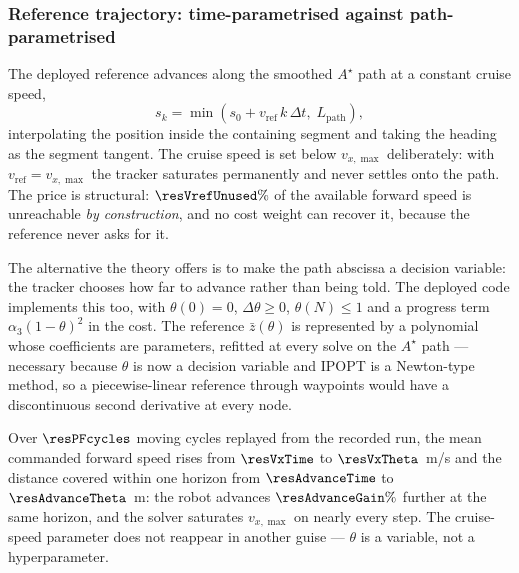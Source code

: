 \documentclass[11pt,a4paper]{article}
\newcommand{\astar}{$A^\star$}
\begin{document}
\subsubsection{Reference trajectory: time-parametrised against path-parametrised}
\label{sec:pathfollow}

The deployed reference advances along the smoothed \astar{} path at a constant cruise speed,
\begin{equation}
  s_k=\min\!\left(s_0+v_{\mathrm{ref}}\,k\,\Delta t,\; L_{\mathrm{path}}\right),
  \label{eq:ref}
\end{equation}
interpolating the position inside the containing segment and taking the heading as the segment tangent. The
cruise speed is set below $v_{x,\max}$ deliberately: with $v_{\mathrm{ref}}=v_{x,\max}$ the tracker saturates
permanently and never settles onto the path. The price is structural: $\resVrefUnused\%$ of the available
forward speed is unreachable \emph{by construction}, and no cost weight
can recover it, because the reference never asks for it.

The alternative the theory offers is to make the path abscissa a decision variable: the tracker chooses how
far to advance rather than being told. The deployed code implements this too, with $\theta(0)=0$,
$\Delta\theta\ge0$, $\theta(N)\le1$ and a progress term $\alpha_3(1-\theta)^2$ in the cost. The reference
$\bar z(\theta)$ is represented by a polynomial whose coefficients are parameters, refitted at every solve on
the \astar{} path --- necessary because $\theta$ is now a decision variable and IPOPT is a Newton-type
method, so a piecewise-linear reference through waypoints would have a discontinuous second derivative at
every node.

\begin{table}[htbp]
  \centering
  \small
  \caption{Time-parametrised against path-parametrised reference, averaged over $\resPFcycles$ cycles replayed from the recorded run \resBag.}
  \label{res:tab:pf}
\end{table}

Over $\resPFcycles$ moving cycles replayed from the recorded run, the mean commanded forward speed rises from
$\resVxTime$ to $\resVxTheta$~m/s and the distance covered within one horizon from $\resAdvanceTime$ to
$\resAdvanceTheta$~m: the robot advances $\resAdvanceGain\%$ further at the same horizon, and the solver
saturates $v_{x,\max}$ on nearly every step. The cruise-speed parameter does not reappear in another guise
--- $\theta$ is a variable, not a hyperparameter.
\end{document}
